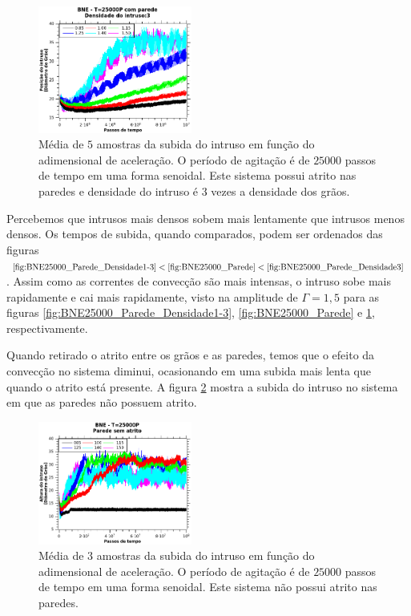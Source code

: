 \begin{figure}
    \centering
    \includegraphics[width=0.45\textwidth]{04-figuras/BNE25000D3.png}
    \caption{Média de $5$ amostras da subida do intruso em função do adimensional de aceleração. O período de agitação é de $25000$ passos de tempo em uma forma senoidal. Este sistema possui atrito nas paredes e densidade do intruso é $3$ vezes a densidade dos grãos.}
    \label{fig:BNE25000_Parede_Densidade3}
\end{figure}

    Percebemos que intrusos mais densos sobem mais lentamente que intrusos menos densos. Os tempos de subida, quando comparados, podem ser ordenados das figuras $\ref{fig:BNE25000_Parede_Densidade1-3} < \ref{fig:BNE25000_Parede} < \ref{fig:BNE25000_Parede_Densidade3}$. Assim como as correntes de convecção são mais intensas, o intruso sobe mais rapidamente e cai mais rapidamente, visto na amplitude de $\Gamma = 1,5$ para as figuras \ref{fig:BNE25000_Parede_Densidade1-3}, \ref{fig:BNE25000_Parede} e \ref{fig:BNE25000_Parede_Densidade3}, respectivamente.

    Quando retirado o atrito entre os grãos e as paredes, temos que o efeito da convecção no sistema diminui, ocasionando em uma subida mais lenta que quando o atrito está presente. A figura \ref{fig:BNE25000_sem_Atrito_Parede} mostra a subida do intruso no sistema em que as paredes não possuem atrito.

\begin{figure}
    \centering
    \includegraphics[width=0.45\textwidth]{04-figuras/BNE25000PsemAtrito.png}
    \caption{Média de $3$ amostras da subida do intruso em função do adimensional de aceleração. O período de agitação é de $25000$ passos de tempo em uma forma senoidal. Este sistema não possui atrito nas paredes.}
    \label{fig:BNE25000_sem_Atrito_Parede}
\end{figure}

